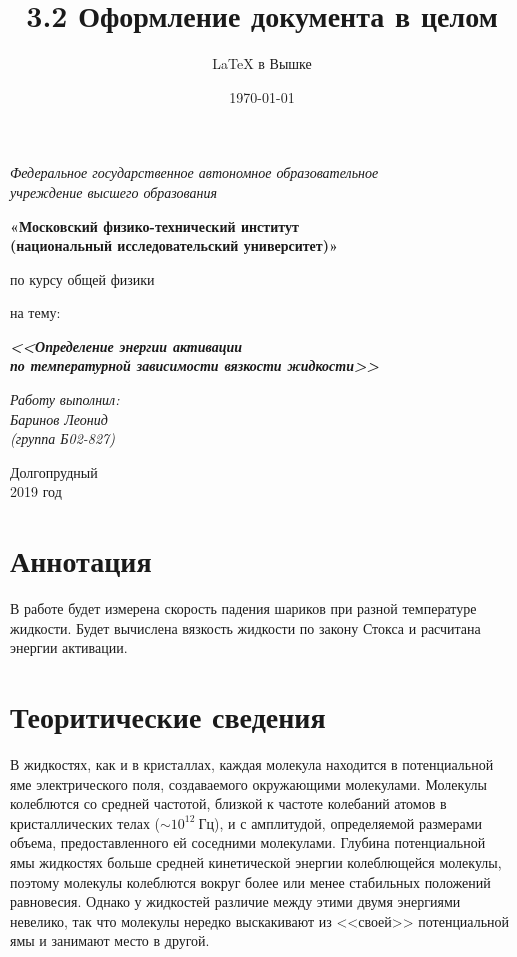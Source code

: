 \documentclass[a4paper,12pt]{article}
\author{\LaTeX{} в Вышке}
\title{3.2 Оформление документа в целом}
\date{\today}
\theoremstyle{plain} %
\theoremstyle{definition} %
\theoremstyle{remark} %
\begin{document}
	\thispagestyle{empty}
	\begin{center}
		\textit{Федеральное государственное автономное образовательное\\ учреждение высшего образования }
		\vspace{0.5ex}
		
		\textbf{«Московский физико-технический институт\\ (национальный исследовательский университет)»}
	\end{center}
	\vspace{10ex}
	\begin{center}
		\vspace{13ex}
		\vspace{1ex}
		
		по курсу общей физики
		
		
		на тему:
		
		\textbf{\textit{<<Определение энергии активации\\ по температурной зависимости вязкости жидкости>>}}
		\vspace{30ex}
		\begin{flushright}
			\noindent
			\textit{Работу выполнил:}
			\\
			\textit{Баринов Леонид \\(группа Б02-827)}
		\end{flushright}
		\vfill
		Долгопрудный \\2019 год
	\end{center}
	\newpage
	\setcounter{page}{1}
	\section{Аннотация}
	В работе будет измерена скорость падения шариков при разной температуре жидкости. Будет вычислена вязкость жидкости по закону Стокса и расчитана энергии активации.
	\section{Теоритические сведения}
	В жидкостях, как и в кристаллах, каждая молекула находится в потенциальной яме электрического поля, создаваемого окружающими молекулами. Молекулы колеблются со средней частотой, близкой к частоте колебаний атомов в кристаллических телах ($\sim 10^{12}\ \text{Гц}$), и с амплитудой, определяемой размерами объема, предоставленного ей соседними молекулами. Глубина потенциальной ямы жидкостях больше средней кинетической энергии колеблющейся молекулы, поэтому молекулы колеблются вокруг более или менее стабильных положений равновесия. Однако у жидкостей различие между этими двумя энергиями невелико, так что молекулы нередко выскакивают из <<своей>> потенциальной ямы и занимают место в другой.
	
\end{document}
